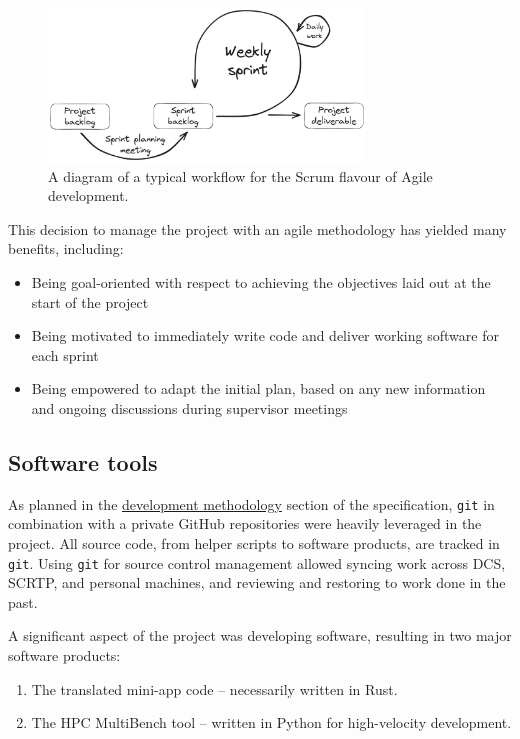 \begin{figure}[h]
    \centering
    \includegraphics[width=0.75\textwidth]{images/6_project_management/excalidraw_agile.png}
    \caption{A diagram of a typical workflow for the Scrum flavour of Agile development.}
    \label{fig:excalidraw_agile}
\end{figure}

This decision to manage the project with an agile methodology has yielded many benefits, including:

\begin{itemize}
    \item Being goal-oriented with respect to achieving the objectives laid out at the start of the project
    \item Being motivated to immediately write code and deliver working software for each sprint
    \item Being empowered to adapt the initial plan, based on any new information and ongoing discussions during supervisor meetings
\end{itemize}

\subsection{Software tools}
\label{ssec:software-tools}

As planned in the \hyperref[sec:development_methodology]{development methodology} section of the specification, \texttt{git} in combination with a private GitHub repositories were heavily leveraged in the project. All source code, from helper scripts to software products, are tracked in \texttt{git}. Using \texttt{git} for source control management allowed syncing work across DCS, SCRTP, and personal machines, and reviewing and restoring to work done in the past.

A significant aspect of the project was developing software, resulting in two major software products:

\begin{enumerate}
    \item The translated mini-app code -- necessarily written in Rust.
    \item The HPC MultiBench tool -- written in Python for high-velocity development.
\end{enumerate}

